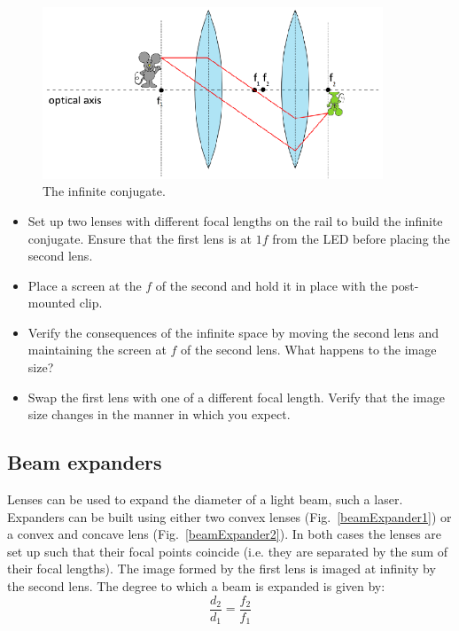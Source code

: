 \documentclass[a4paper]{report}
\begin{document}
\begin{figure}[h]
\center
\includegraphics[width=4in]{infiniteConjugate.eps}
\caption{The infinite conjugate.}
\label{infiniteConjugate}
\end{figure}

\begin{itemize}
\item Set up two lenses with different focal lengths on the rail to build the infinite conjugate. 
Ensure that the first lens is at $1f$ from the LED before placing the second lens. 
\item Place a screen at the $f$ of the second and hold it in place with the post-mounted clip.
\item Verify the consequences of the infinite space by moving the second lens and maintaining the screen at $f$ of the second lens. 
What happens to the image size?
\item Swap the first lens with one of a different focal length. 
Verify that the image size changes in the manner in which you expect. 
\end{itemize}



\clearpage


\subsection{Beam expanders}
Lenses can be used to expand the diameter of a light beam, such a laser.
Expanders can be built using either two convex lenses (Fig.~\ref{beamExpander1}) or a convex and concave lens (Fig.~\ref{beamExpander2}). 
In both cases the lenses are set up such that their focal points coincide (i.e. they are separated by the sum of their focal lengths). 
The image formed by the first lens is imaged at infinity by the second lens.
The degree to which a beam is expanded is given by:
\begin{equation}
\frac{d_2}{d_1}=\frac{f_2}{f_1}
\label{eq:beamExp}
\end{equation}
\end{document}
